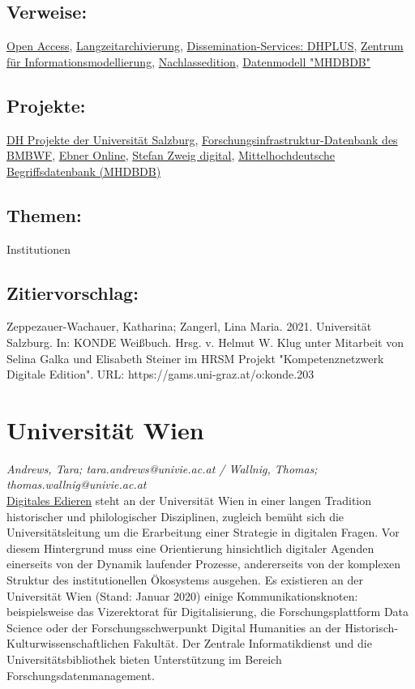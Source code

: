 \documentclass{article}
\begin{document}
        \subsection*{Verweise:}\href{https://gams.uni-graz.at/o:konde.152}{Open Access}, \href{https://gams.uni-graz.at/o:konde.6}{Langzeitarchivierung}, \href{https://gams.uni-graz.at/o:konde.68}{Dissemination-Services: DHPLUS}, \href{https://gams.uni-graz.at/o:konde.217}{Zentrum für Informationsmodellierung}, \href{https://gams.uni-graz.at/o:konde.140}{Nachlassedition}, \href{https://gams.uni-graz.at/o:konde.52}{Datenmodell "MHDBDB"}\subsection*{Projekte:}\href{https://www.uni-salzburg.at/index.php?id=209704}{DH Projekte der Universität Salzburg}, \href{https://forschungsinfrastruktur.bmbwf.gv.at/}{Forschungsinfrastruktur-Datenbank des BMBWF}, \href{http://wfe.sbg.ac.at/exist/apps/Frontpage/index.html}{Ebner Online}, \href{www.stefanzweig.digital}{Stefan Zweig digital}, \href{http://mhdbdb.sbg.ac.at/}{Mittelhochdeutsche Begriffsdatenbank (MHDBDB)}\subsection*{Themen:}Institutionen\subsection*{Zitiervorschlag:}Zeppezauer-Wachauer, Katharina; Zangerl, Lina Maria. 2021. Universität Salzburg. In: KONDE Weißbuch. Hrsg. v. Helmut W. Klug unter Mitarbeit von Selina Galka und Elisabeth Steiner im HRSM Projekt "Kompetenznetzwerk Digitale Edition". URL: https://gams.uni-graz.at/o:konde.203\newpage\section*{Universität Wien} \emph{Andrews, Tara; tara.andrews@univie.ac.at / Wallnig, Thomas; thomas.wallnig@univie.ac.at}\\
        
    \href{http://gams.uni-graz.at/o:konde.59}{Digitales Edieren} steht an der Universität Wien in einer langen Tradition historischer und philologischer Disziplinen, zugleich bemüht sich die Universitätsleitung um die Erarbeitung einer Strategie in digitalen Fragen. Vor diesem Hintergrund muss eine Orientierung hinsichtlich digitaler Agenden einerseits von der Dynamik laufender Prozesse, andererseits von der komplexen Struktur des institutionellen Ökosystems ausgehen. Es existieren an der Universität Wien (Stand: Januar 2020) einige Kommunikationsknoten: beispielsweise das Vizerektorat für Digitalisierung, die Forschungsplattform Data Science oder der Forschungsschwerpunkt Digital Humanities an der Historisch-Kulturwissenschaftlichen Fakultät. Der Zentrale Informatikdienst und die Universitätsbibliothek bieten Unterstützung im Bereich Forschungsdatenmanagement. \\
            
\end{document}
